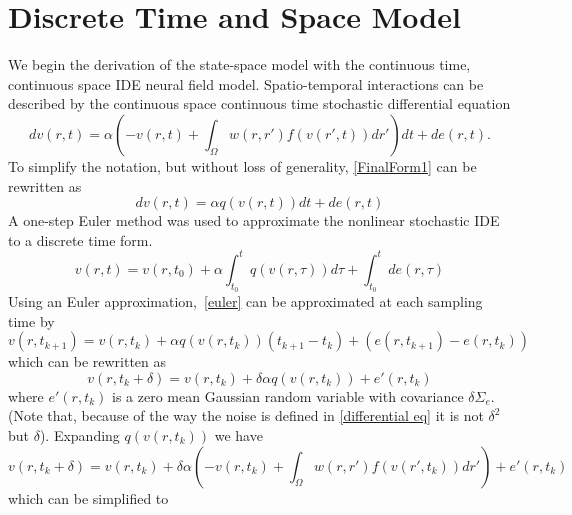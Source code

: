 \documentclass[onecolumn,draftcls]{IEEEtran}
\begin{document}
\section{Discrete Time and Space Model}
We begin the derivation of the state-space model with the continuous time, continuous space IDE neural field model. 
Spatio-temporal interactions can be described by the continuous space continuous time stochastic differential equation
\begin{equation}\label{differential eq}	
dv\left( r,t \right) = \alpha \left( -v\left( r,t \right) + \int_\Omega  {w\left( r,r' \right)f\left( {v\left( r',t \right)} \right)dr'} \right) dt  + d e\left( r,t \right).
\end{equation}
To simplify the notation, but without loss of generality, \ref{FinalForm1} can be rewritten as
\begin{equation}\label{differential simplified}
	dv\left( r,t \right) = \alpha q\left(v(r,t) \right) dt  + d e\left( r,t \right)
\end{equation}
A one-step Euler method was used to approximate the nonlinear stochastic IDE to a discrete time form. 
\begin{equation}\label{euler}
	v\left(r,t\right) =  v(r,t_0) + \alpha \int_{t_0}^{t} q\left(v(r,\tau) \right) d\tau  + \int_{t_0}^{t} d e\left(r,\tau\right)
\end{equation}
Using an Euler approximation,~\ref{euler} can be approximated at each sampling time by
\begin{equation}\label{euler approx 1}
	v\left(r,t_{k+1} \right) =  v(r,t_k) + \alpha q\left(v(r,t_k)\right) (t_{k+1} - t_k) + (e(r,t_{k+1}) - e(r,t_k))
\end{equation}
which can be rewritten as
\begin{equation}\label{euler approx 2}
	v\left(r,t_k + \delta \right) =  v(r,t_k) + \delta \alpha q\left(v(r,t_k)\right) + e'(r,t_k)
\end{equation}
where $e'(r,t_k)$ is a zero mean Gaussian random variable with covariance $\delta\Sigma_e$. (Note that, because of the way the noise is defined in \ref{differential eq} it is not $\delta^2$ but $\delta$). Expanding $q\left(v(r,t_k)\right)$ we have
\begin{equation}\label{discrete time model}
	v\left(r,t_k + \delta \right) =  v(r,t_k) + \delta \alpha \left( -v\left( r,t_k \right) + \int_\Omega  {w\left( r,r' \right)f\left( {v\left( r',t_k \right)} \right)dr'} \right) + e'(r,t_k)
\end{equation}
which can be simplified to
\end{document}
